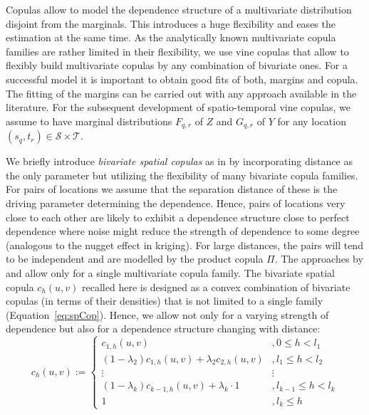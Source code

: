 \documentclass[article,nojss]{jss}
\begin{document}
Copulas allow to model the dependence structure of a multivariate distribution disjoint from the marginals. This introduces a huge flexibility and eases the estimation at the same time. As the analytically known multivariate copula families are rather limited in their flexibility, we use vine copulas that allow to flexibly build multivariate copulas by any combination of bivariate ones. For a successful model it is important to obtain good fits of both, margins and copula. The fitting of the margins can be carried out with any approach available in the literature. For the subsequent development of spatio-temporal vine copulas, we assume to have marginal distributions $F_{q,r}$ of $Z$ and $G_{q,r}$ of $Y$ for any location $(s_q,t_r) \in \mathcal{S}\times\mathcal{T}$.

We briefly introduce \emph{bivariate spatial copulas} as in \citet{Graler2014} by incorporating distance as the only parameter but utilizing the flexibility of many bivariate copula families. For pairs of locations we assume that the separation distance of these is the driving parameter determining the dependence. Hence, pairs of locations very close to each other are likely to exhibit a dependence structure close to perfect dependence where noise might reduce the strength of dependence to some degree (analogous to the nugget effect in kriging). For large distances, the pairs will tend to be independent and are modelled by the product copula $\Pi$. The approaches by \citet{Bardossy2011} and \citet{Kazianka2010} allow only for a single multivariate copula family. The bivariate spatial copula $c_h(u,v)$ recalled here is designed as a convex combination of bivariate copulas (in terms of their densities) that is not limited to a single family (Equation~\ref{eq:spCop}). Hence, we allow not only for a varying strength of dependence but also for a dependence structure changing with distance: 
\begin{equation}\label{eq:spCop}
c_{h} (u,v) := \left\{
\begin{array}{ll}
c_{1,h}(u,v) &, 0 \leq h < l_1 \\
(1-\lambda_2) c_{1,h}(u,v) + \lambda_2 c_{2,h}(u,v) &, l_1 \leq h < l_2 \\
\vdots & \vdots \\
(1-\lambda_k) c_{k-1,h}(u,v) + \lambda_k\cdot 1 &, l_{k-1} \leq h < l_k \\
1 &, l_k \leq h 
\end{array}
\right.
\end{equation}
\end{document}
